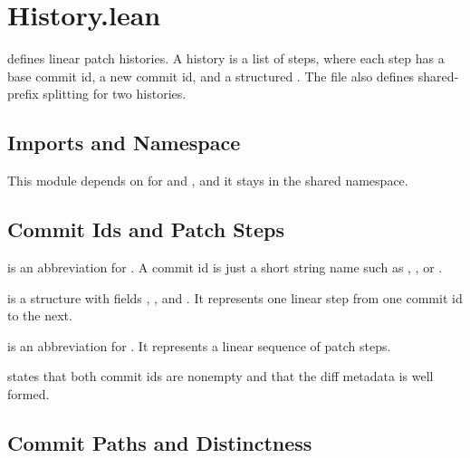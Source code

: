 \section{History.lean}

 defines linear patch histories. A history is a list of
steps, where each step has a base commit id, a new commit id, and a structured
. The file also defines shared-prefix splitting for two histories.

\subsection{Imports and Namespace}

This module depends on  for  and
, and it stays in the shared
 namespace.

\subsection{Commit Ids and Patch Steps}

\begin{definition}[CommitId]
\code{[CommitId]} is an abbreviation for . A commit id is just a
short string name such as , , or .
\end{definition}

\begin{definition}[PatchStep]
\code{[PatchStep]} is a structure with fields ,
, and . It represents one linear step from one
commit id to the next.
\end{definition}

\begin{definition}[PushHistory]
\code{[PushHistory]} is an abbreviation for . It
represents a linear sequence of patch steps.
\end{definition}

\begin{definition}
 states that both commit ids are nonempty and that
the diff metadata is well formed.
\end{definition}

\subsection{Commit Paths and Distinctness}

